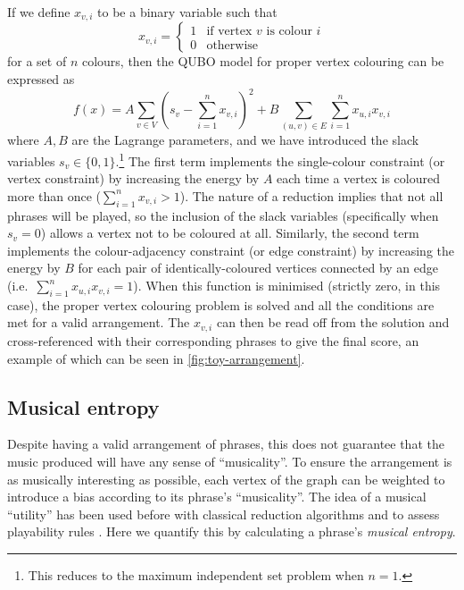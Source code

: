 \documentclass[12pt]{article}
\theoremstyle{definition}
\begin{document}
If we define $x_{v,i}$ to be a binary variable such that
\begin{equation}
    x_{v,i} =
    \begin{cases}
        1 & \text{if vertex $v$ is colour $i$} \\
        0 & \text{otherwise}
    \end{cases}
\end{equation}
for a set of $n$ colours, then the QUBO model for proper vertex colouring can be expressed as
\begin{equation}
    f(x)=A\sum_{v \in V}\left(s_v-\sum_{i=1}^{n} x_{v,i}\right)^2+B\sum_{(u,v) \in E}\sum_{i=1}^n x_{u,i}x_{v,i}
    \label{eq:colouring}
\end{equation}
where $A,B$ are the Lagrange parameters, and we have introduced the slack variables $s_v\in\{0,1\}$.\footnote{This reduces to the maximum independent set problem when $n=1$.} The first term implements the single-colour constraint (or vertex constraint) by increasing the energy by $A$ each time a vertex is coloured more than once ($\sum_{i=1}^{n} x_{v,i}>1$). The nature of a reduction implies that not all phrases will be played, so the inclusion of the slack variables (specifically when $s_v=0$) allows a vertex not to be coloured at all. Similarly, the second term implements the colour-adjacency constraint (or edge constraint) by increasing the energy by $B$ for each pair of identically-coloured vertices connected by an edge (i.e.\ $\sum_{i=1}^n x_{u,i}x_{v,i}=1$). When this function is minimised (strictly zero, in this case), the proper vertex colouring problem is solved and all the conditions are met for a valid arrangement. The $x_{v,i}$ can then be read off from the solution and cross-referenced with their corresponding phrases to give the final score, an example of which can be seen in \cref{fig:toy-arrangement}.

\subsection{Musical entropy}

Despite having a valid arrangement of phrases, this does not guarantee that the music produced will have any sense of ``musicality''. To ensure the arrangement is as musically interesting as possible, each vertex of the graph can be weighted to introduce a bias according to its phrase's ``musicality''. The idea of a musical ``utility'' has been used before with classical reduction algorithms \cite{huang_towards_2012} and to assess playability rules \cite{chiu_automatic_2009}. Here we quantify this by calculating a phrase's \emph{musical entropy}.
\end{document}
